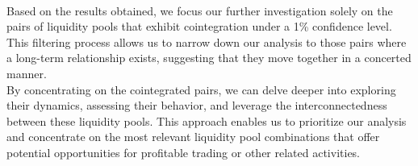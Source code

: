 \\[3mm]
\noindent Based on the results obtained, we focus our further investigation solely on the pairs of liquidity pools that exhibit cointegration under a 1\% confidence level. This filtering process allows us to narrow down our analysis to those pairs where a long-term relationship exists, suggesting that they move together in a concerted manner.
\\[3mm]
By concentrating on the cointegrated pairs, we can delve deeper into exploring their dynamics, assessing their behavior, and leverage the interconnectedness between these liquidity pools. This approach enables us to prioritize our analysis and concentrate on the most relevant liquidity pool combinations that offer potential opportunities for profitable trading or other related activities.



